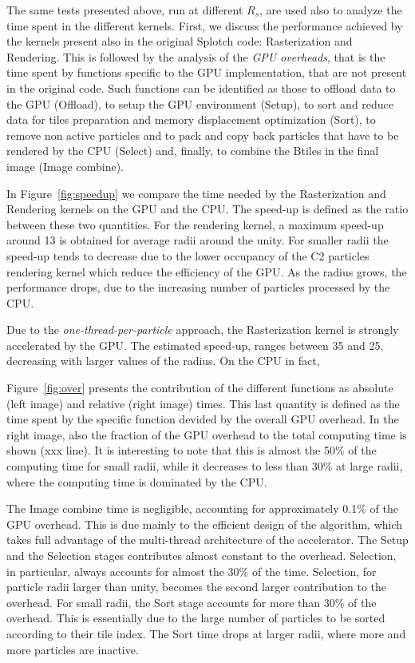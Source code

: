 \documentclass[11pt]{article}
\begin{document}
\noindent
The same tests presented above, run at different $R_s$, are used also to
analyze the 
time spent in the different kernels. First, we discuss the performance 
achieved by the kernels present also in the original Splotch code: Rasterization and
Rendering.
This is followed by the analysis of the  
{\it GPU overheads}, that is the time spent by functions specific
to the GPU implementation, that are not present in the original code. Such functions can 
be identified as those to offload data to the GPU (Offload),
to setup the GPU environment (Setup),
to sort and reduce data for tiles preparation and memory displacement optimization (Sort),
to remove non active particles and to pack and copy back particles that have to 
be rendered by the CPU (Select) and, finally,
to combine the Btiles in the final image (Image combine).   

In Figure~\ref{fig:speedup} we compare the time needed by the Rasterization and Rendering
kernels on the GPU and the CPU. The speed-up is defined as the ratio between these two
quantities. For the rendering kernel, a maximum speed-up around 13 is obtained for
average radii around the unity. For smaller radii the speed-up tends to decrease due 
to the lower occupancy of the C2 particles rendering kernel which reduce the efficiency of the GPU.
As the radius grows, the performance drops, due to the increasing number of particles
processed by the CPU.    

Due to the {\it one-thread-per-particle} approach, the Rasterization kernel is strongly
accelerated by the GPU. The estimated speed-up, ranges between 35 and 25, decreasing 
with larger values of the radius. On the CPU in fact,  

Figure~\ref{fig:over} presents the contribution of the different functions
as absolute (left image) and relative (right image) times. This last 
quantity is defined as the time spent by the specific function devided by
the overall GPU overhead. In the right image, also the fraction of the GPU
overhead to the total computing time is shown (xxx line). It is interesting to 
note that this is almost the 50\% of the computing time for small radii,
while it decreases to less than 30\% at large radii, where the
computing time is dominated by the CPU. 

The Image combine time is negligible, accounting for approximately 0.1\% of 
the GPU overhead. This is due mainly to the efficient design of the 
algorithm, which takes full advantage of the multi-thread architecture 
of the accelerator. The Setup and the Selection stages contributes 
almost constant to the overhead. Selection, in particular, 
always accounts for almost the 30\% of the time.
Selection, for particle radii larger than unity, becomes the second 
larger contribution to the overhead. For small radii, the Sort
stage accounts for more than 30\% of the overhead. This is essentially due to 
the large number of particles to be sorted according to their tile index. 
The Sort time drops at larger radii, where more and more particles are
inactive.
 
\end{document}

